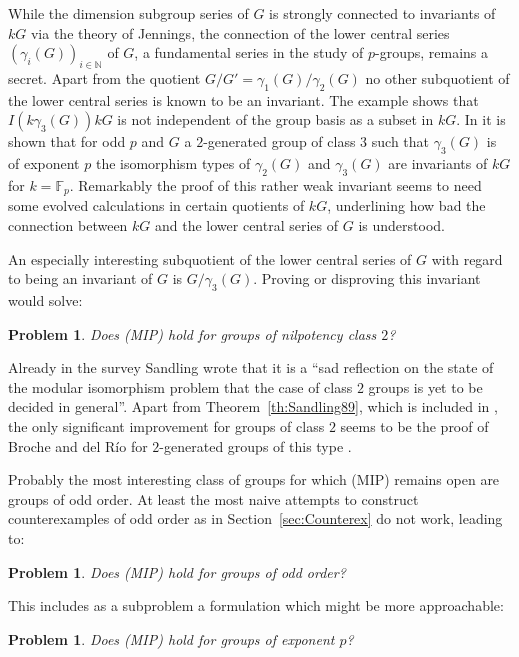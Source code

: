 \documentclass[11pt, a4paper]{amsart}
\newtheorem{problem}[theorem]{Problem}
\theoremstyle{definition}
\begin{document}
While the dimension subgroup series of $G$ is strongly connected to invariants of $kG$ via the theory of Jennings, the connection of the lower central series $(\gamma_i(G))_{i \in \mathbb{N}}$ of $G$, a fundamental series in the study of $p$-groups, remains a secret. Apart from the quotient $G/G' = \gamma_1(G)/\gamma_2(G)$ no other subquotient of the lower central series is known to be an invariant.  The example \cite[Example 2.1]{BaginskiKurdics} shows that $I(k\gamma_3(G))kG$ is not independent of the group basis as a subset in $kG$. 
In \cite[Theorem 4.1]{MargolisStanojkovski21} it is shown that for odd $p$ and $G$ a $2$-generated group of class $3$ such that $\gamma_3(G)$ is of exponent $p$ the isomorphism types of $\gamma_2(G)$ and $\gamma_3(G)$ are invariants of $kG$ for $k = \mathbb{F}_p$. Remarkably the proof of this rather weak invariant seems to need some evolved calculations in certain quotients of $kG$, underlining how bad the connection between $kG$ and the lower central series of $G$ is understood.

An especially interesting subquotient of the lower central series of $G$ with regard to being an invariant of $G$ is $G/\gamma_3(G)$. Proving or disproving this invariant would solve:

\begin{problem}
Does (MIP) hold for groups of nilpotency class $2$?
\end{problem}

Already in the survey \cite{SandlingSurvey} Sandling wrote that it is a ``sad reflection on the state of the modular isomorphism problem that the case of class $2$ groups is yet to be decided in general''. Apart from Theorem~\ref{th:Sandling89}, which is included in \cite{SandlingSurvey}, the only significant improvement for groups of class $2$ seems to be the proof of Broche and del R\'io for $2$-generated groups of this type \cite{BrochedelRio21}. 

Probably the most interesting class of groups for which (MIP) remains open are groups of odd order. At least the most naive attempts to construct counterexamples of odd order as in Section~\ref{sec:Counterex} do not work, leading to:

\begin{problem}
Does (MIP) hold for groups of odd order?
\end{problem}

This includes as a subproblem a formulation which might be more approachable:

\begin{problem}
Does (MIP) hold for groups of exponent $p$?
\end{problem}
\end{document}
